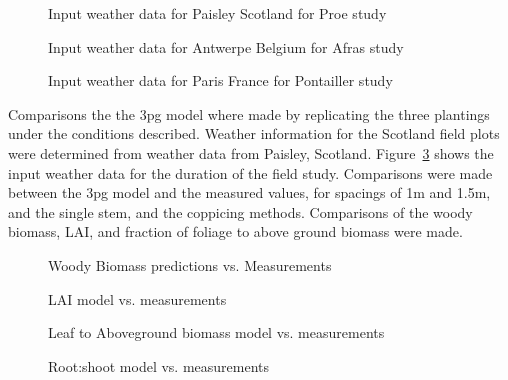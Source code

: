 \documentclass[10pt]{article}
\begin{document}
\begin{figure}
  \centering
  
  \caption{Input weather data for Paisley Scotland for Proe study}
  \label{fig:proe-weather}
\end{figure}

\begin{figure}
  \centering
  
  \caption{Input weather data for Antwerpe Belgium for Afras study}
  \label{fig:proe-weather}
\end{figure}

\begin{figure}
  \centering
  
  \caption{Input weather data for Paris France for Pontailler study}
  \label{fig:proe-weather}
\end{figure}

Comparisons the the \ac{3pg} model where made by replicating the three
plantings under the conditions described.  Weather information for the
Scotland field plots were determined from weather data from Paisley,
Scotland.  Figure~\ref{fig:proe-weather} shows the input weather data
for the duration of the field study.  Comparisons were made between
the \ac{3pg} model and the measured values, for spacings of 1m and
1.5m, and the single stem, and the coppicing methods.  Comparisons of
the woody biomass, \ac{LAI}, and fraction of foliage to above ground
biomass were made.

\begin{figure}
  \centering
  
  \caption{Woody Biomass predictions vs. Measurements}
  \label{fig:proe-wood}
\end{figure}

\begin{figure}[!ht]
  \centering
    
  \caption{\ac{LAI} model vs. measurements}
  \label{fig:proe-light}
\end{figure}

\begin{figure}[!ht]
  \centering
    
  \caption{Leaf to Aboveground biomass model vs. measurements}
  \label{fig:proe-leaf}
\end{figure}

\begin{figure}[!ht]
  \centering
    
  \caption{Root:shoot model vs. measurements}
  \label{fig:proe-rootshoot}
\end{figure}
\end{document}
